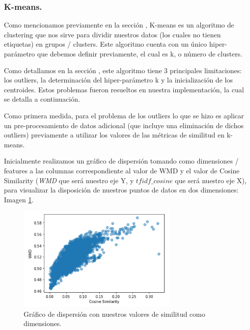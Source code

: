 \documentclass[12pt,a4paper]{article}
\begin{document}
\begin{sloppypar}
\begin{itemize}
\end{itemize}

\cleardoublepage

\subsubsection{K-means.}\label{imp_kmeans}

Como mencionamos previamente en la sección \textit{}, K-means es un algoritmo de clustering que nos sirve para dividir nuestros datos (los cuales no tienen etiquetas) en grupos / clusters. Este algoritmo cuenta con un único hiper-parámetro que debemos definir previamente, el cual es k, o número de clusters.

Como detallamos en la sección \textit{}, este algoritmo tiene 3 principales limitaciones: los outliers, la determinación del hiper-parámetro k y la inicialización de los centroides. Estos problemas fueron resueltos en nuestra implementación, la cual se detalla a continuación. 

Como primera medida, para el problema de los outliers lo que se hizo es aplicar un pre-procesamiento de datos adicional (que incluye una eliminación de dichos outliers) previamente a utilizar los valores de las métricas de similitud en k-means. 

Inicialmente realizamos un gráfico de dispersión tomando como dimensiones / features a las columnas correspondiente al valor de WMD y el valor de Cosine Similarity (\textit{WMD} que será nuestro eje Y, y \textit{$tfidf\_cosine$} que será nuestro eje X), para visualizar la disposición de nuestros puntos de datos en dos dimensiones: Imagen \ref{fig:dispersion}.

\begin{figure}[H]   
\centering
\includegraphics[width=0.7\textwidth]{images/implementacion_5/dispersion.png}
\captionsetup{justification=centering,margin=2cm}
\caption{Gráfico de dispersión con nuestros valores de similitud como dimensiones.}
\label{fig:dispersion}
\end{figure}


\end{sloppypar}
\end{document}
